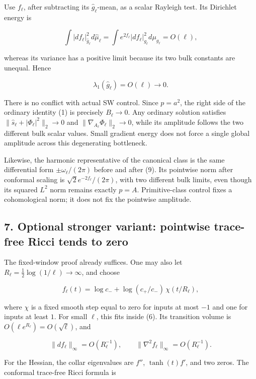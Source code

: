 \documentclass[
  11pt,
]{article}
\begin{document}
Use \(f_\ell\), after subtracting its \(\widehat g_\ell\)-mean, as a
scalar Rayleigh test. Its Dirichlet energy is

\[
 \int|df_\ell|_{\widehat g_\ell}^2d\widehat\mu_\ell
 =\int e^{2f_\ell}|df_\ell|_{g_\ell}^2d\mu_{g_\ell}=O(\ell),
\]

whereas its variance has a positive limit because its two bulk constants
are unequal. Hence

\[
 \lambda_1(\widehat g_\ell)=O(\ell)\longrightarrow0.
 \tag{23}
\]

There is no conflict with actual SW control. Since \(p=a^2\), the right
side of the ordinary identity (1) is precisely \(B_\ell\to0\). Any
ordinary solution satisfies \(\|\widehat s_\ell+|\Phi_\ell|^2\|_2\to0\)
and \(\|\nabla_{A_\ell}\Phi_\ell\|_2\to0\), while its amplitude follows
the two different bulk scalar values. Small gradient energy does not
force a single global amplitude across this degenerating bottleneck.

Likewise, the harmonic representative of the canonical class is the same
differential form \(\pm\omega_\ell/(2\pi)\) before and after (9). Its
pointwise norm after conformal scaling is
\(\sqrt2 e^{-2f_\ell}/(2\pi)\), with two different bulk limits, even
though its squared \(L^2\) norm remains exactly \(p=A\). Primitive-class
control fixes a cohomological norm; it does not fix the pointwise
amplitude.

\hypertarget{optional-stronger-variant-pointwise-trace-free-ricci-tends-to-zero}{%
\subsection{7. Optional stronger variant: pointwise trace-free Ricci
tends to
zero}\label{optional-stronger-variant-pointwise-trace-free-ricci-tends-to-zero}}

The fixed-window proof already suffices. One may also let
\(R_\ell=\tfrac12\log(1/\ell)\to\infty\), and choose

\[
 f_\ell(t)=\log c_-+
 \log(c_+/c_-)\,\chi(t/R_\ell),
\]

where \(\chi\) is a fixed smooth step equal to zero for inputs at most
\(-1\) and one for inputs at least \(1\). For small \(\ell\), this fits
inside (6). Its transition volume is
\(O(\ell e^{R_\ell})=O(\sqrt\ell)\), and

\[
 \|df_\ell\|_\infty=O(R_\ell^{-1}),\qquad
 \|\nabla^2f_\ell\|_\infty=O(R_\ell^{-1}).
\]

For the Hessian, the collar eigenvalues are \(f''\), \(\tanh(t)f'\), and
two zeros. The conformal trace-free Ricci formula is
\end{document}
